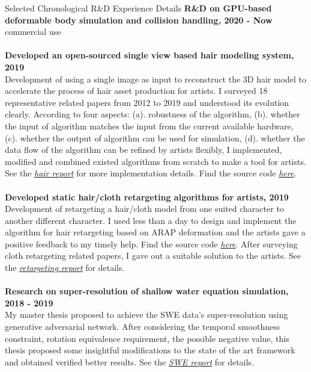\documentclass{resume} %
\begin{document}
\begin{rSection}{Selected Chronological R\&D Experience Details}
  {\bf R\&D on GPU-based deformable body simulation and collision handling, 2020 - Now}\\ commercial use\\
  \\{\bf Developed an open-sourced single view based hair modeling system, 2019}\\ Development of using a single image as input to reconstruct the 3D hair model to accelerate the process of hair asset production for artists. I surveyed 18 representative related papers from 2012 to 2019 and understood its evolution clearly. According to four aspects: (a). robustness of the algorithm, (b). whether the input of algorithm matches the input from the current available hardware, (c). whether the output of algorithm can be used for simulation, (d). whether the data flow of the algorithm can be refined by artists flexibly, I implemented, modified and combined existed algorithms from scratch to make a tool for artists. See the \emph{\href{https://wtyatzoo.github.io/reports/hair.pdf}{hair report}} for more implementation details. Find the source code \emph{\href{https://github.com/WTYatzoo/hair\_modeling}{here}}.\\
  \\{\bf Developed static hair/cloth retargeting algorithms for artists, 2019}\\ Development of retargeting a hair/cloth model from one suited character to another different character. I used less than a day to design and implement the algorithm for hair retargeting based on ARAP deformation and the artists gave a positive feedback to my timely help. Find the source code \emph{\href{https://github.com/WTYatzoo/hair\_retargeting}{here}}. After surveying cloth retargeting related papers, I gave out a suitable solution to the artists. See the \emph{\href{https://wtyatzoo.github.io/reports/retargeting.pdf}{retargeting report}} for details.\\
  \\{\bf Research on super-resolution of shallow water equation simulation, 2018 - 2019}\\ My master thesis proposed to achieve the SWE data's super-resolution using generative adversarial network. After considering the temporal smoothness constraint, rotation equivalence requirement, the possible negative value, this thesis proposed some insightful modifications to the state of the art framework and obtained verified better results. See the \emph{\href{https://wtyatzoo.github.io/reports/SWE.pdf}{SWE report}} for details. \\

\end{rSection}
\end{document}

